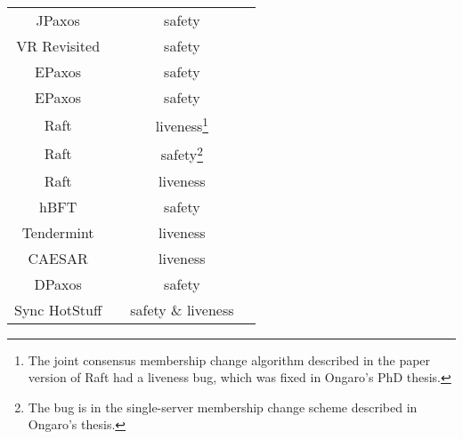 \documentclass{article}
\begin{document}
\begin{center}
\begin{tabular}{ c c c c }
    JPaxos & \cite{konczakJPaxosStateMachine2011} & safety &
    \cite{michaelRecoveringSharedObjects2017} \\

    VR Revisited & \cite{liskovViewstampedReplicationRevisited2012} & safety &
    \cite{michaelRecoveringSharedObjects2017} \\

    EPaxos & \cite{moraruThereMoreConsensus2013} & safety &
    \cite{sutraCorrectnessEgalitarianPaxos2020} \\

    EPaxos & \cite{moraruThereMoreConsensus2013} & safety &
    \cite{whittakerEPaxosDependencySet2021} \\

    Raft & \cite{ongaroSearchUnderstandableConsensus2014} &
    liveness\footnote{The joint consensus membership change algorithm described
    in the paper version of Raft had a liveness bug, which was fixed in
    Ongaro's PhD thesis.} & \cite{hochConfigurationChanges2014} \\

    Raft & \cite{ongaroConsensusBridgingTheory2014} & safety\footnote{The bug
    is in the single-server membership change scheme described in Ongaro's
    thesis.} & \cite{amos15812TermPaper2015,
    ongaroBugSingleserverMembership2015} \\

    Raft & \cite{ongaroSearchUnderstandableConsensus2014,
    ongaroConsensusBridgingTheory2014} & liveness &
    \cite{howardRaftDoesNot2020, jensenExaminingRaftBehaviour2021} \\

    hBFT & \cite{duanHBFTSpeculativeByzantine2015} & safety &
    \cite{shresthaRevisitingHBFTSpeculative2019} \\

    Tendermint & \cite{buchmanTendermintByzantineFault2016} & liveness &
    \cite{cachinBlockchainConsensusProtocols2017} \\

    CAESAR & \cite{arunSpeedingConsensusChasing2017} & liveness &
    \cite{enesEfficientReplicationTimestamp2021} \\

    DPaxos & \cite{nawabDPaxosManagingData2018} & safety &
    \cite{whittakerMatchmakerPaxosReconfigurable2021} \\

    Sync HotStuff & \cite{abrahamSyncHotStuffSimple2019} & safety \& liveness &
    \cite{momoseForceLockingAttackSync2019} \\


\end{tabular}
\end{center}
\end{document}
